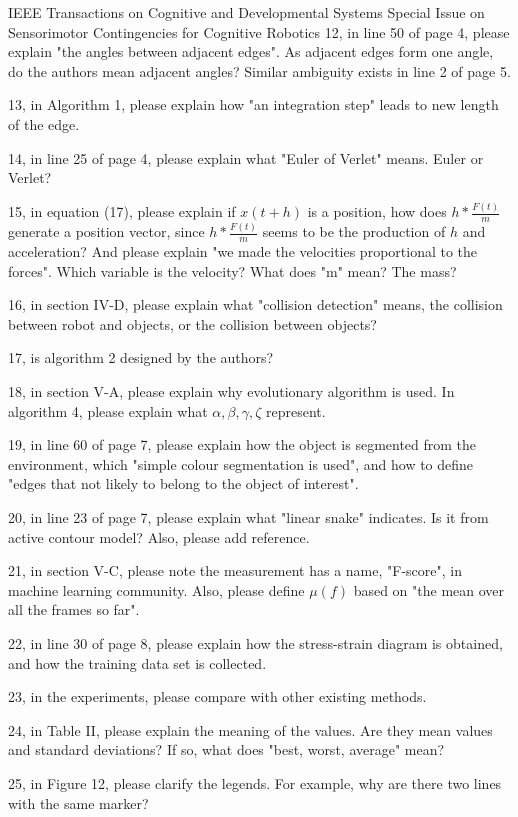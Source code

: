 \documentclass[a4paper,12pt]{letter}
\begin{document}
\begin{letter}{IEEE Transactions on Cognitive and Developmental Systems\newline
Special Issue on Sensorimotor Contingencies for Cognitive Robotics}
12, in line 50 of page 4, please explain "the angles between adjacent edges". As adjacent edges form one angle, do the authors mean adjacent angles? Similar ambiguity exists in line 2 of page 5. 

13, in Algorithm 1, please explain how "an integration step" leads to new length of the edge. 

14, in line 25 of page 4, please explain what "Euler of Verlet" means. Euler or Verlet? 

15, in equation (17), please explain if $x(t+h)$ is a position, how does $h*\frac{F(t)}{m}$ generate a position vector, since $h*\frac{F(t)}{m}$ seems to be the production of $h$ and acceleration? And please explain "we made the velocities proportional to the forces". Which variable is the velocity? What does "m" mean? The mass? 

16, in section IV-D, please explain what "collision detection" means, the collision between robot and objects, or the collision between objects? 

17, is algorithm 2 designed by the authors? 

18, in section V-A, please explain why evolutionary algorithm is used. In algorithm 4, please explain what $\alpha, \beta,\gamma,\zeta$ represent. 

19, in line 60 of page 7, please explain how the object is segmented from the environment, which "simple colour segmentation is used", and how to define "edges that not likely to belong to the object of interest". 

20, in line 23 of page 7, please explain what "linear snake" indicates. Is it from active contour model? Also, please add reference. 

21, in section V-C, please note the measurement has a name, "F-score", in machine learning community. Also, please define $\mu(f)$ based on "the mean over all the frames so far". 

22, in line 30 of page 8, please explain how the stress-strain diagram is obtained, and how the training data set is collected. 

23, in the experiments, please compare with other existing methods. 

24, in Table II, please explain the meaning of the values. Are they mean values and standard deviations? If so, what does "best, worst, average" mean? 

25, in Figure 12, please clarify the legends. For example, why are there two lines with the same marker? 


\end{letter}
\end{document}
